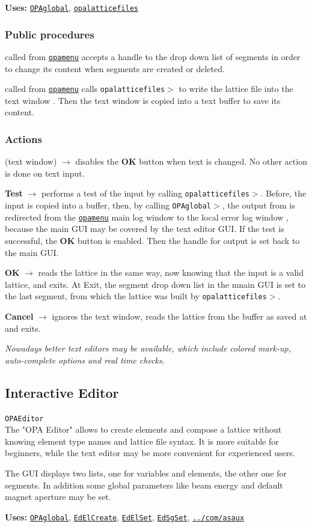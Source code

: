\documentclass[12pt]{article}
\newcommand\code[1]{{\tt #1}}
\newcommand{\ofld}[1]{\colorbox{black!15}{{\bf #1}}}
\newcommand{\ofldx}[1]{\colorbox{black!15}{(#1)}}
\newcommand\guico[1]{{\color{blue}\code{#1}}}
\newcommand{\unico}[1]{{\color{burntorange}\code{#1}}}
\newcommand{\evcod}[2]{\ofld{#1} $\rightarrow$ \guico{#2}}
\newcommand{\evcodx}[2]{\ofldx{#1} $\rightarrow$ \guico{#2}}
\newcommand{\prcod}[2]{\opauni{#1}$>$\unico{#2}}
\newcommand{\opagui}[1]{\colorbox{blue!20}{\code{#1}}}
\newcommand{\oguih}[2]{\subsection{\label{#2}#1}{\Huge\opagui{#2}}\\}
\newcommand{\ogui}[1]{\hyperref[#1]{\opagui{#1}}}
\newcommand{\opauni}[1]{\colorbox{orange!30}{\code{#1}}}
\newcommand{\ouni}[1]{\hyperref[#1]{\opauni{#1}}}
\newcommand{\uses}[1]{{\bf Uses: } #1}
\newcommand{\act}[1]{\subsubsection*{Actions} #1}
\newcommand{\ppro}[1]{\subsubsection*{Public procedures} #1}
\newcommand{\todo}[1]{{\color{red}\em #1}}
\begin{document}
\uses{\ouni{OPAglobal}, \ouni{opalatticefiles}}

\ppro{
\guico{Init} called from \ogui{opamenu} accepts a handle to the drop down list of segments in order to change its content when segments are created or deleted.

\guico{LoadLattice} called from \ogui{opamenu} calls \prcod{opalatticefiles}{WriteLattice} to write the lattice file into the text window \guico{EdtWin}. Then the text window is copied into a text buffer to save its content.
}

\act{
\evcodx{text window}{disableOKBut} disables the \ofld{OK} button when text is changed. No other action is done on text input.

\evcod{Test}{filetest} performs a test of the input by calling \prcod{opalatticefiles}{LatRead}. Before, the input is copied into a buffer, then, by calling \prcod{OPAglobal}{PassErrLogHandle}, the output from \unico{LatRead} is redirected from the \ogui{opamenu} main log window to the local error log window \guico{myerrlog}, because the main GUI may be covered by the text editor GUI. If the test is successful, the \ofld{OK} button is enabled. Then the handle for output is set back to the main GUI.


\evcod{OK}{fileget} reads the lattice in the same way, now knowing that the input is a valid lattice, and exits. At Exit, the segment drop down list in the mnain GUI is set to the last segment, from which the lattice was built by \prcod{opalatticefiles}{LatRead}.

\evcod{Cancel}{fileRestore} ignores the text window, reads the lattice from the buffer as saved at \guico{Init} and exits.

}

\todo{Nowadays better text editors may be available, which include colored mark-up, auto-complete options and real time checks.}

\oguih{Interactive Editor}{OPAEditor}

The "OPA Editor" allows to create elements and compose a lattice without knowing element type names and lattice file syntax. It is more suitable for beginners, while the text editor may be more convenient for experienced users.

The GUI displays two lists, one for variables and elements, the other one for segments. In addition some global parameters like beam energy and default magnet aperture may be set.

\uses{\ouni{OPAglobal}, \ogui{EdElCreate}, \ogui{EdElSet}, \ogui{EdSgSet}, \ouni{../com/asaux}}
\end{document}
